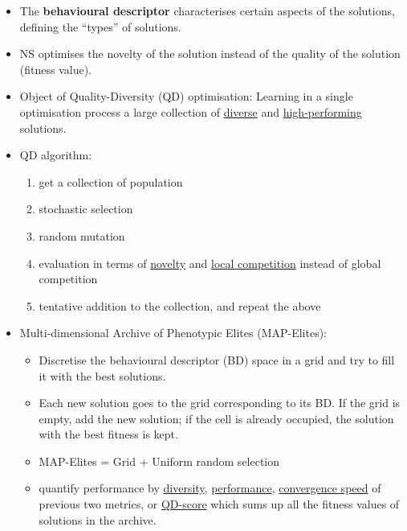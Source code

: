 \documentclass[twocolumn,landscape,10pt]{article}
\theoremstyle{definition}
\begin{document}
\begin{itemize}
    \item The \textbf{behavioural descriptor} characterises certain aspects of
        the solutions, defining the ``types'' of solutions.
    \item NS optimises the novelty of the solution instead of the quality of the
        solution (fitness value).
    \item Object of Quality-Diversity (QD) optimisation: Learning in a single
        optimisation process a large collection of \underline{diverse} and
        \underline{high-performing} solutions.
    \item QD algorithm:
        \begin{enumerate}
            \item get a collection of population
            \item stochastic selection
            \item random mutation
            \item evaluation in terms of \underline{novelty} and
                \underline{local competition} instead of global competition
            \item tentative addition to the collection, and repeat the above
        \end{enumerate} 
    \item Multi-dimensional Archive of Phenotypic Elites (MAP-Elites):
        \begin{itemize}
            \item Discretise the behavioural descriptor (BD) space in a grid and
                try to fill it with the best solutions.
            \item Each new solution goes to the grid corresponding to its BD.
                If the grid is empty, add the new solution; if the cell is
                already occupied, the solution with the best fitness is kept.
            \item MAP-Elites = Grid + Uniform random selection
            \item quantify performance by \underline{diversity},
                \underline{performance}, \underline{convergence speed} of
                previous two metrics, or \underline{QD-score} which sums up all
                the fitness values of solutions in the archive.
        \end{itemize} 
\end{itemize} 
\end{document}

